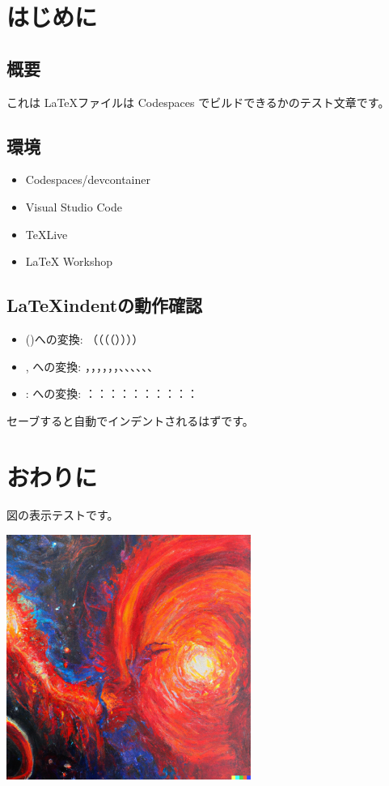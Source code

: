 \documentclass[12pt]{jreport}
\begin{document}
  \chapter{はじめに}
    \section{概要}
      これは \LaTeX ファイルは Codespaces でビルドできるかのテスト文章です。
		\section{環境}
			\begin{itemize}
				\item Codespaces/devcontainer
				\item Visual Studio Code
				\item TeXLive
				\item LaTeX Workshop
			\end{itemize}
		\section{\LaTeX indentの動作確認}
			\begin{itemize}
				\item ()への変換: （（（（））））
				\item , への変換: ，，，，，，、、、、、、
				\item : への変換: ：：：：：：：：：： 
			\end{itemize}
			セーブすると自動でインデントされるはずです。
  \chapter{おわりに}
    図の表示テストです。

		\includegraphics*[width=8cm]{./images/photo.png}
\end{document}
